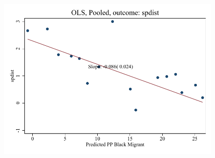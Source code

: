 \documentclass{article}
\begin{document}
\clearpage
\begin{figure}
	\centering
	\includegraphics[width=.8\textwidth]{figures/binscatter/pooled_spdist_ols.pdf}
\end{figure}
\clearpage
\end{document}
